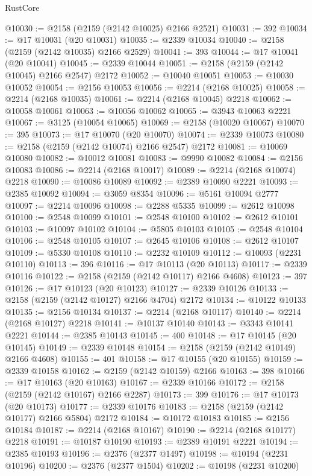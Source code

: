 \begin{lexlean}{RustCore}
\begin{coremodule}
@10030 := @2158 (@2159 (@2142 @10025) @2166 @2521)
@10031 := 392
@10034 := @17 @10031 (@20 @10031)
@10035 := @2339 @10034
@10040 := @2158 (@2159 (@2142 @10035) @2166 @2529)
@10041 := 393
@10044 := @17 @10041 (@20 @10041)
@10045 := @2339 @10044
@10051 := @2158 (@2159 (@2142 @10045) @2166 @2547) @2172
@10052 := @10040 @10051
@10053 := @10030 @10052
@10054 := @2156 @10053
@10056 := @2214 (@2168 @10025)
@10058 := @2214 (@2168 @10035)
@10061 := @2214 (@2168 @10045) @2218
@10062 := @10058 @10061
@10063 := @10056 @10062
@10065 := @3943 @10063 @2221
@10067 := @3125 (@10054 @10065)
@10069 := @2158 (@10020 @10067)
@10070 := 395
@10073 := @17 @10070 (@20 @10070)
@10074 := @2339 @10073
@10080 := @2158 (@2159 (@2142 @10074) @2166 @2547) @2172
@10081 := @10069 @10080
@10082 := @10012 @10081
@10083 := @9990 @10082
@10084 := @2156 @10083
@10086 := @2214 (@2168 @10017)
@10089 := @2214 (@2168 @10074) @2218
@10090 := @10086 @10089
@10092 := @2389 @10090 @2221
@10093 := @2385 @10092
@10094 := @3059 @8354
@10096 := @5161 @10094 @2777
@10097 := @2214 @10096
@10098 := @2288 @5335
@10099 := @2612 @10098
@10100 := @2548 @10099
@10101 := @2548 @10100
@10102 := @2612 @10101
@10103 := @10097 @10102
@10104 := @5805 @10103
@10105 := @2548 @10104
@10106 := @2548 @10105
@10107 := @2645 @10106
@10108 := @2612 @10107
@10109 := @5330 @10108
@10110 := @2232 @10109
@10112 := @10093 (@2231 @10110)
@10113 := 396
@10116 := @17 @10113 (@20 @10113)
@10117 := @2339 @10116
@10122 := @2158 (@2159 (@2142 @10117) @2166 @4608)
@10123 := 397
@10126 := @17 @10123 (@20 @10123)
@10127 := @2339 @10126
@10133 := @2158 (@2159 (@2142 @10127) @2166 @4704) @2172
@10134 := @10122 @10133
@10135 := @2156 @10134
@10137 := @2214 (@2168 @10117)
@10140 := @2214 (@2168 @10127) @2218
@10141 := @10137 @10140
@10143 := @3343 @10141 @2221
@10144 := @2385 @10143
@10145 := 400
@10148 := @17 @10145 (@20 @10145)
@10149 := @2339 @10148
@10154 := @2158 (@2159 (@2142 @10149) @2166 @4608)
@10155 := 401
@10158 := @17 @10155 (@20 @10155)
@10159 := @2339 @10158
@10162 := @2159 (@2142 @10159) @2166
@10163 := 398
@10166 := @17 @10163 (@20 @10163)
@10167 := @2339 @10166
@10172 := @2158 (@2159 (@2142 @10167) @2166 @2287)
@10173 := 399
@10176 := @17 @10173 (@20 @10173)
@10177 := @2339 @10176
@10183 := @2158 (@2159 (@2142 @10177) @2166 @5804) @2172
@10184 := @10172 @10183
@10185 := @2156 @10184
@10187 := @2214 (@2168 @10167)
@10190 := @2214 (@2168 @10177) @2218
@10191 := @10187 @10190
@10193 := @2389 @10191 @2221
@10194 := @2385 @10193
@10196 := @2376 (@2377 @1497)
@10198 := @10194 (@2231 @10196)
@10200 := @2376 (@2377 @1504)
@10202 := @10198 (@2231 @10200)

\end{coremodule}
\end{lexlean}
